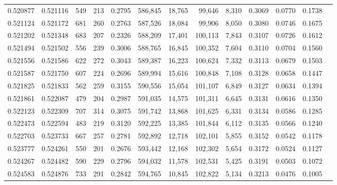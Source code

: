 \begin{tabular}{rrrrrrrrrrrrr}
0.520877 & 0.521116 &    549 &   213 &                                     0.2795 & 586,845 &  18,765 &  99,646 &   8,310 & 0.3069 & 0.0770 & 0.1738 \\
0.521124 & 0.521172 &    681 &   260 &                                     0.2763 & 587,526 &  18,084 &  99,906 &   8,050 & 0.3080 & 0.0746 & 0.1675 \\
0.521202 & 0.521348 &    683 &   207 &                                     0.2326 & 588,209 &  17,401 & 100,113 &   7,843 & 0.3107 & 0.0726 & 0.1612 \\
0.521494 & 0.521502 &    556 &   239 &                                     0.3006 & 588,765 &  16,845 & 100,352 &   7,604 & 0.3110 & 0.0704 & 0.1560 \\
0.521556 & 0.521586 &    622 &   272 &                                     0.3043 & 589,387 &  16,223 & 100,624 &   7,332 & 0.3113 & 0.0679 & 0.1503 \\
0.521587 & 0.521750 &    607 &   224 &                                     0.2696 & 589,994 &  15,616 & 100,848 &   7,108 & 0.3128 & 0.0658 & 0.1447 \\
0.521825 & 0.521833 &    562 &   259 &                                     0.3155 & 590,556 &  15,054 & 101,107 &   6,849 & 0.3127 & 0.0634 & 0.1394 \\
0.521861 & 0.522087 &    479 &   204 &                                     0.2987 & 591,035 &  14,575 & 101,311 &   6,645 & 0.3131 & 0.0616 & 0.1350 \\
0.522123 & 0.522309 &    707 &   314 &                                     0.3075 & 591,742 &  13,868 & 101,625 &   6,331 & 0.3134 & 0.0586 & 0.1285 \\
0.522473 & 0.522594 &    483 &   219 &                                     0.3120 & 592,225 &  13,385 & 101,844 &   6,112 & 0.3135 & 0.0566 & 0.1240 \\
0.522703 & 0.523733 &    667 &   257 &                                     0.2781 & 592,892 &  12,718 & 102,101 &   5,855 & 0.3152 & 0.0542 & 0.1178 \\
0.523777 & 0.524261 &    550 &   201 &                                     0.2676 & 593,442 &  12,168 & 102,302 &   5,654 & 0.3172 & 0.0524 & 0.1127 \\
0.524267 & 0.524482 &    590 &   229 &                                     0.2796 & 594,032 &  11,578 & 102,531 &   5,425 & 0.3191 & 0.0503 & 0.1072 \\
0.524583 & 0.524876 &    733 &   291 &                                     0.2842 & 594,765 &  10,845 & 102,822 &   5,134 & 0.3213 & 0.0476 & 0.1005 \\

\end{tabular}
